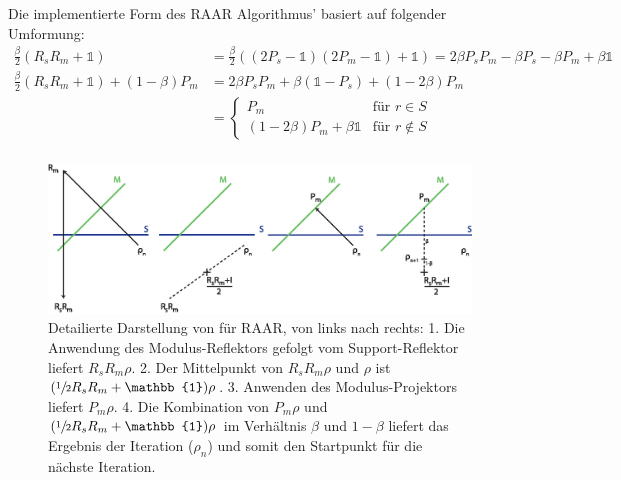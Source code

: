 	Die implementierte Form des RAAR Algorithmus' basiert auf folgender Umformung:
	\begin{align*}
	\frac{\beta}{2}\left(R_sR_m+\mathbb{1}\right)
	&=\frac{\beta}{2}\left((2P_s-\mathbb{1})(2P_m-\mathbb{1})+\mathbb{1}\right)
		=2\beta P_sP_m-\beta P_s-\beta P_m+\beta\mathbb{1}\\
		\frac{\beta}{2}\left(R_sR_m+\mathbb{1}\right)+\left(1-\beta\right) P_m
		&=2\beta P_sP_m+\beta (\mathbb{1}-P_s)+ (1-2\beta)P_m\\
		&=
		\begin{cases}
			P_m &\text{für } r\in S\\
			(1-2\beta)P_m+\beta\mathbb{1}  &\text{für } r\notin S
		\end{cases}\\
	\end{align*}
	\begin{figure}
		\centering
		\includegraphics[width=1\textwidth]{images/raar.eps}
		\caption[RAAR]{Detailierte Darstellung von  für RAAR, von links nach rechts: 1. Die Anwendung des Modulus-Reflektors gefolgt vom Support-Reflektor liefert $R_sR_m\rho$. 2. Der Mittelpunkt von $R_sR_m\rho$ und $\rho$ ist $(\sfrac{1}{2}R_sR_m+\mathbb{1})\rho$. 3. Anwenden des Modulus-Projektors liefert $P_m\rho$. 4. Die Kombination von $P_m\rho$ und $(\sfrac{1}{2}R_sR_m+\mathbb{1})\rho$ im Verhältnis $\beta$ und $1-\beta$ liefert das Ergebnis der Iteration ($\rho_n$) und somit den Startpunkt für die nächste Iteration.}
		\label{fig:raar}
	\end{figure} 	

